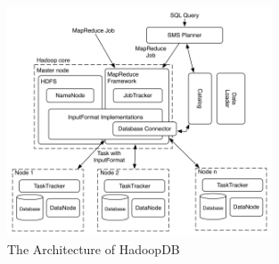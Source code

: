 \documentclass[12pt,a4paper]{scrartcl}		%
\begin{document}
\begin{figure}[t]
  \centering
  \includegraphics[width=0.7\textwidth]{images/hadoopdb-arch.png}
  \caption{The Architecture of HadoopDB\cite{journals/pvldb/AbouzeidBARS09}}
  \label{fig:hadoopdbarch}
\end{figure}
\end{document}
